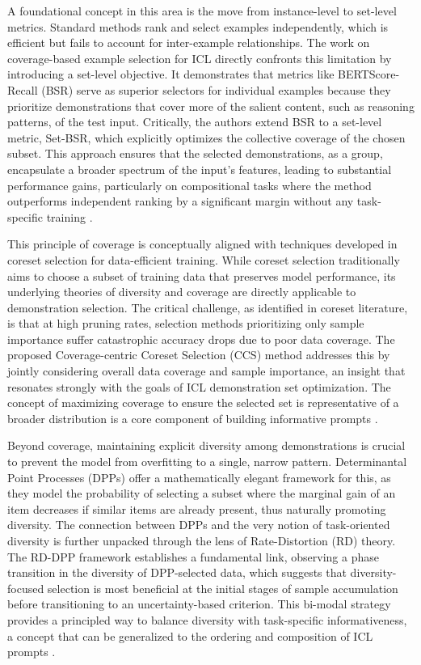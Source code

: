 \documentclass[11pt]{article}
\begin{document}
A foundational concept in this area is the move from instance-level to set-level metrics. Standard methods rank and select examples independently, which is efficient but fails to account for inter-example relationships. The work on coverage-based example selection for ICL directly confronts this limitation by introducing a set-level objective. It demonstrates that metrics like BERTScore-Recall (BSR) serve as superior selectors for individual examples because they prioritize demonstrations that cover more of the salient content, such as reasoning patterns, of the test input. Critically, the authors extend BSR to a set-level metric, Set-BSR, which explicitly optimizes the collective coverage of the chosen subset. This approach ensures that the selected demonstrations, as a group, encapsulate a broader spectrum of the input's features, leading to substantial performance gains, particularly on compositional tasks where the method outperforms independent ranking by a significant margin without any task-specific training \cite{ref20}.

This principle of coverage is conceptually aligned with techniques developed in coreset selection for data-efficient training. While coreset selection traditionally aims to choose a subset of training data that preserves model performance, its underlying theories of diversity and coverage are directly applicable to demonstration selection. The critical challenge, as identified in coreset literature, is that at high pruning rates, selection methods prioritizing only sample importance suffer catastrophic accuracy drops due to poor data coverage. The proposed Coverage-centric Coreset Selection (CCS) method addresses this by jointly considering overall data coverage and sample importance, an insight that resonates strongly with the goals of ICL demonstration set optimization. The concept of maximizing coverage to ensure the selected set is representative of a broader distribution is a core component of building informative prompts \cite{ref138}.

Beyond coverage, maintaining explicit diversity among demonstrations is crucial to prevent the model from overfitting to a single, narrow pattern. Determinantal Point Processes (DPPs) offer a mathematically elegant framework for this, as they model the probability of selecting a subset where the marginal gain of an item decreases if similar items are already present, thus naturally promoting diversity. The connection between DPPs and the very notion of task-oriented diversity is further unpacked through the lens of Rate-Distortion (RD) theory. The RD-DPP framework establishes a fundamental link, observing a phase transition in the diversity of DPP-selected data, which suggests that diversity-focused selection is most beneficial at the initial stages of sample accumulation before transitioning to an uncertainty-based criterion. This bi-modal strategy provides a principled way to balance diversity with task-specific informativeness, a concept that can be generalized to the ordering and composition of ICL prompts \cite{ref139}.
\end{document}
